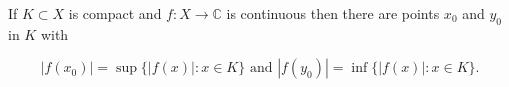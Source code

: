If $K \subset X$ is compact and $f: X \to \mathbb{C}$ is continuous then there are points $x_0$ and $y_0$ in $K$ with

$$|f(x_0)| = \sup \{|f(x)|: x \in K\} \text{ and } |f(y_0)| = \inf \{|f(x)|: x \in K\}.$$